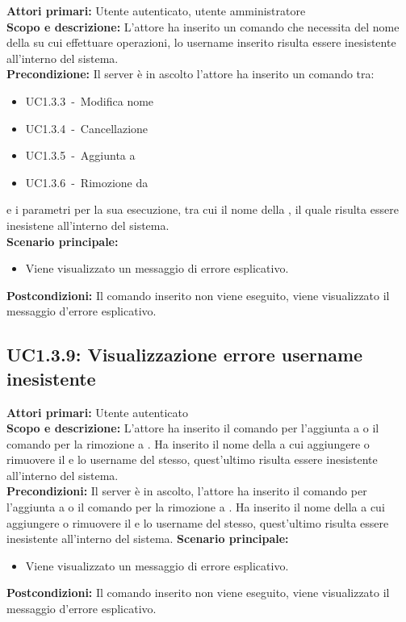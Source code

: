 \documentclass{scalatekids-article}
\begin{document}
\textbf{Attori primari:} Utente autenticato, utente amministratore\\
\textbf{Scopo e descrizione:} L'attore ha inserito un comando che necessita del nome della  su cui effettuare operazioni, lo username inserito risulta essere inesistente all'interno del sistema.\\
\textbf{Precondizione:}
Il server è in ascolto l'attore ha inserito un comando tra:
\begin{itemize}
\item UC1.3.3\ -\ Modifica nome 
\item UC1.3.4\ -\ Cancellazione 
\item UC1.3.5\ -\ Aggiunta  a 
\item UC1.3.6\ -\ Rimozione  da 
\end{itemize}
e i parametri per la sua esecuzione, tra cui il nome della , il quale risulta essere inesistene all'interno del sistema.\\
\textbf{Scenario principale:}
\begin{itemize}
\item Viene visualizzato un messaggio di errore esplicativo.
\end{itemize}
\textbf{Postcondizioni:} Il comando inserito non viene eseguito, viene visualizzato il messaggio d'errore esplicativo.

\subsection{UC1.3.9: Visualizzazione errore username inesistente}
\textbf{Attori primari:} Utente autenticato\\
\textbf{Scopo e descrizione:}
L'attore ha inserito il comando per l'aggiunta  a
 o il comando per la rimozione  a
. Ha inserito il nome della  a cui
aggiungere o rimuovere il  e lo username del
 stesso, quest'ultimo risulta essere inesistente all'interno
del sistema.\\
\textbf{Precondizioni:} Il server è in ascolto, l'attore ha inserito il comando per l'aggiunta  a
 o il comando per la rimozione  a
. Ha inserito il nome della  a cui
aggiungere o rimuovere il  e lo username del
 stesso, quest'ultimo risulta essere inesistente all'interno
del sistema.
\textbf{Scenario principale:}
\begin{itemize}
\item Viene visualizzato un messaggio di errore esplicativo.
\end{itemize}
\textbf{Postcondizioni:} Il comando inserito non viene eseguito, viene visualizzato il messaggio d'errore esplicativo.
\end{document}
